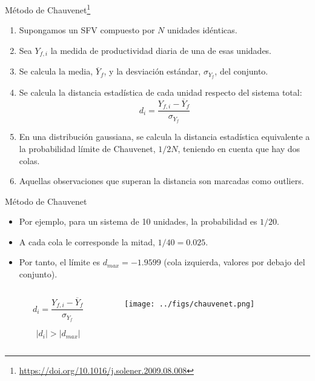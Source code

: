 \documentclass[aspectratio=169, usenames,svgnames,dvipsnames]{beamer}
\begin{document}
\begin{frame}[label={sec:orgf510d1b}]{Método de Chauvenet\footnote{\url{https://doi.org/10.1016/j.solener.2009.08.008}}}
\begin{enumerate}
\item Supongamos un SFV compuesto por \(N\) unidades idénticas.
\item Sea \(Y_{f,i}\) la medida de \alert{productividad diaria} de una de esas unidades.
\item Se calcula la \alert{media}, \(\overline{Y}_f\), y la \alert{desviación estándar}, \(\sigma_{Y_f}\), del \alert{conjunto}.
\item Se calcula la \alert{distancia estadística} de cada unidad respecto del sistema total:
\[
d_i = \frac{Y_{f,i} - \overline{Y}_f}{\sigma_{Y_f}}
\]
\item En una distribución gaussiana, se calcula la distancia estadística
equivalente a la probabilidad límite de Chauvenet, \(1/2N\), teniendo en cuenta
que hay dos colas.
\item Aquellas observaciones que superan la distancia son \alert{marcadas como outliers}.
\end{enumerate}
\end{frame}


\begin{frame}[label={sec:orgbecf038}]{Método de Chauvenet}
\begin{itemize}
\item Por ejemplo, para un sistema de 10 unidades, la probabilidad es \(1/20\).

\item A cada cola le corresponde la mitad, \(1/40 = 0.025\).

\item Por tanto, el límite es \(d_{max} = - 1.9599\) (cola izquierda, valores por debajo del conjunto).
\end{itemize}


\begin{columns}
\begin{column}{0.3\columnwidth}
\[
  d_i = \frac{Y_{f,i} - \overline{Y}_f}{\sigma_{Y_f}}
\]

\[
\left| d_i \right| > \left| d_{max} \right|
\]
\end{column}

\begin{column}{0.8\columnwidth}
\begin{center}
\begin{center}
\texttt{[image: ../figs/chauvenet.png]}
\end{center}
\end{center}
\end{column}
\end{columns}
\end{frame}
\end{document}
